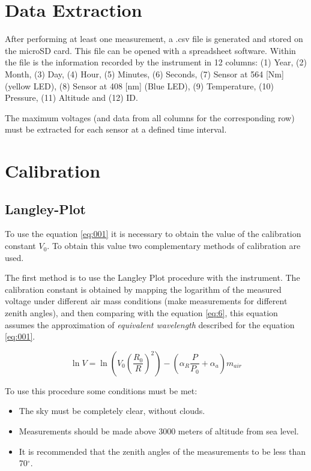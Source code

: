\documentclass[12pt,letterpaper]{article}
\numberwithin{figure}{section}
\numberwithin{equation}{section}
\numberwithin{table}{section}
\begin{document}

\newpage

\section{Data Extraction}

After performing at least one measurement, a .csv file is generated and stored on the microSD card. This file can be opened with a spreadsheet software. Within the file is the information recorded by the instrument in 12 columns: (1) Year, (2) Month, (3) Day, (4) Hour, (5) Minutes, (6) Seconds, (7) Sensor at 564 [Nm] (yellow LED), (8) Sensor at 408 [nm] (Blue LED), (9) Temperature, (10) Pressure, (11) Altitude and (12) ID.

The maximum voltages (and data from all columns for the corresponding row) must be extracted for each sensor at a defined time interval.

\section{Calibration}

\subsection{Langley-Plot}

To use the equation \ref{eq:001} it is necessary to obtain the value of the calibration constant $ V_0 $. To obtain this value two complementary methods of calibration are used.

The first method is to use the Langley Plot procedure with the instrument. The calibration constant is obtained by mapping the logarithm of the measured voltage under different air mass conditions (make measurements for different zenith angles), and then comparing with the equation \ref{eq:6}, this equation assumes the approximation of \textit{equivalent wavelength} described for the equation \ref{eq:001}.

\begin{equation}
    \ln V = \ln\left(V_0 \left(\frac{R_0}{R} \right)^2\right) - \left(\alpha_R \frac{P}{P_0} + \alpha_a\right)m_{air}
    \label{eq:6}
\end{equation}

To use this procedure some conditions must be met:


\begin{itemize}
    \item The sky must be completely clear, without clouds.
    \item Measurements should be made above 3000 meters of altitude from sea level.
    \item It is recommended that the zenith angles of the measurements to be less than 70$^{\circ}$.
\end{itemize}
\end{document}
